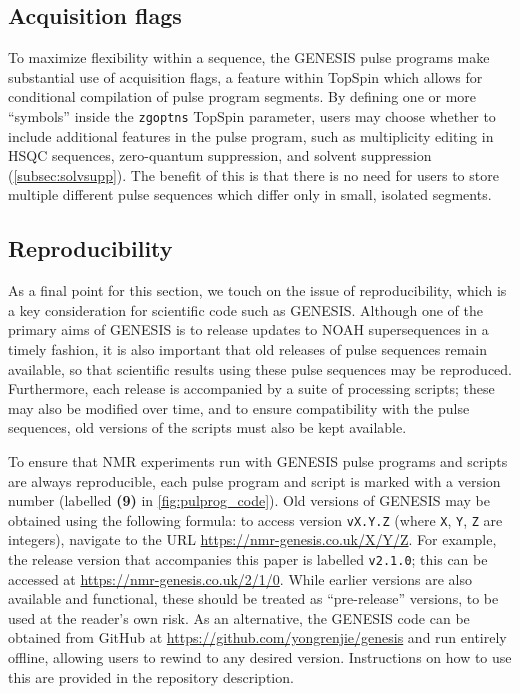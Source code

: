\documentclass[a4paper,11pt]{article}
\begin{document}
\begin{refsection}
\subsection{Acquisition flags}
\label{subsec:zgoptns}

To maximize flexibility within a sequence, the GENESIS pulse programs make substantial use of acquisition flags, a feature within TopSpin which allows for conditional compilation of pulse program segments.
By defining one or more ``symbols'' inside the \texttt{zgoptns} TopSpin parameter, users may choose whether to include additional features in the pulse program, such as multiplicity editing in HSQC sequences, zero-quantum suppression\autocite{Thrippleton2003ACIE}, and solvent suppression (\cref{subsec:solvsupp}).
The benefit of this is that there is no need for users to store multiple different pulse sequences which differ only in small, isolated segments.

\subsection{Reproducibility}
\label{subsec:repro}

As a final point for this section, we touch on the issue of reproducibility, which is a key consideration for scientific code such as GENESIS.\autocite{Perkel2020N}
Although one of the primary aims of GENESIS is to release updates to NOAH supersequences in a timely fashion, it is also important that old releases of pulse sequences remain available, so that scientific results using these pulse sequences may be reproduced. 
Furthermore, each release is accompanied by a suite of processing scripts; these may also be modified over time, and to ensure compatibility with the pulse sequences, old versions of the scripts must also be kept available.

To ensure that NMR experiments run with GENESIS pulse programs and scripts are always reproducible, each pulse program and script is marked with a version number (labelled \textbf{(9)} in \cref{fig:pulprog_code}).
Old versions of GENESIS may be obtained using the following formula: to access version \texttt{vX.Y.Z} (where \texttt{X}, \texttt{Y}, \texttt{Z} are integers), navigate to the URL \url{https://nmr-genesis.co.uk/X/Y/Z}.
For example, the release version that accompanies this paper is labelled \texttt{v2.1.0}; this can be accessed at \url{https://nmr-genesis.co.uk/2/1/0}.
While earlier versions are also available and functional, these should be treated as ``pre-release'' versions, to be used at the reader's own risk.
As an alternative, the GENESIS code can be obtained from GitHub at \url{https://github.com/yongrenjie/genesis} and run entirely offline, allowing users to rewind to any desired version.
Instructions on how to use this are provided in the repository description.


\end{refsection}
\end{document}
